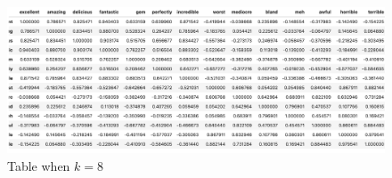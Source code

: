 \documentclass[11pt]{article}
\begin{document}
\begin{figure}[H]
    \centering
    \includegraphics[scale=0.4]{images/6c.png}
    \caption{Table when $k=8$}
\end{figure}
\end{document}
